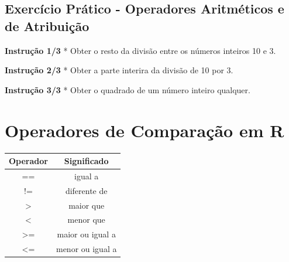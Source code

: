 \documentclass[
]{article}
\newenvironment{Shaded}{\begin{snugshade}}{\end{snugshade}}
\begin{document}
\hypertarget{exercuxedcio-pruxe1tico---operadores-aritmuxe9ticos-e-de-atribuiuxe7uxe3o}{%
\subsection{Exercício Prático - Operadores Aritméticos e de
Atribuição}\label{exercuxedcio-pruxe1tico---operadores-aritmuxe9ticos-e-de-atribuiuxe7uxe3o}}

\textbf{Instrução 1/3} * Obter o resto da divisão entre os números
inteiros 10 e 3.

\begin{Shaded}
\begin{Highlighting}[]

\end{Highlighting}
\end{Shaded}

\textbf{Instrução 2/3} * Obter a parte interira da divisão de 10 por 3.

\begin{Shaded}
\begin{Highlighting}[]

\end{Highlighting}
\end{Shaded}

\textbf{Instrução 3/3} * Obter o quadrado de um número inteiro qualquer.

\begin{Shaded}
\begin{Highlighting}[]

\end{Highlighting}
\end{Shaded}

\hypertarget{operadores-de-comparauxe7uxe3o-em-r}{%
\section{Operadores de Comparação em
R}\label{operadores-de-comparauxe7uxe3o-em-r}}

\begin{longtable}[]{@{}cc@{}}
\toprule()
Operador & Significado \\
\midrule()
\endhead
== & igual a \\
!= & diferente de \\
\textgreater{} & maior que \\
\textless{} & menor que \\
\textgreater= & maior ou igual a \\
\textless= & menor ou igual a \\
\bottomrule()
\end{longtable}
\end{document}
